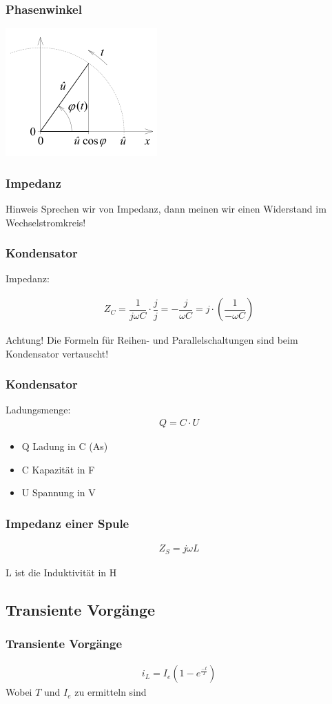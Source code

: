\documentclass[german,ignorenonframetext]{beamer} %
\begin{document}
\begin{frame}
\frametitle{Phasenwinkel}
\begin{center}
\includegraphics[scale=0.5]{../phase.png} 
\end{center}
\end{frame}

\begin{frame}
\frametitle{Impedanz}
\begin{block}{Hinweis}
Sprechen wir von Impedanz, dann meinen wir einen Widerstand im Wechselstromkreis!
\end{block}
\end{frame}

\begin{frame}
\frametitle{Kondensator}
Impedanz:
\begin{center}
\begin{eqnarray}
Z_{C} = \dfrac{1}{j \omega C} \cdot \dfrac{j}{j} = - \dfrac{j}{\omega C} = j \cdot (\dfrac{1}{- \omega C})
\end{eqnarray}
\end{center}
\begin{alertblock}{Achtung!}
Die Formeln für Reihen- und Parallelschaltungen sind beim Kondensator vertauscht!
\end{alertblock}
\end{frame}

\begin{frame}
\frametitle{Kondensator}
Ladungsmenge:
\begin{eqnarray}
Q = C \cdot U
\end{eqnarray}

\begin{itemize}
\item Q Ladung in C (As)
\item C Kapazität in F
\item U Spannung in V
\end{itemize}
\end{frame}

\begin{frame}
\frametitle{Impedanz einer Spule}
\begin{center}
\begin{eqnarray}
Z_{S} = j \omega L
\end{eqnarray}
\end{center}
L ist die Induktivität in H
\end{frame}


\subsection{Transiente Vorgänge}
\begin{frame}
\frametitle{Transiente Vorgänge}
\begin{center}
\begin{eqnarray}
    i_{L} = I_{e} ( 1 - e^{\frac{-t}{T}})
\end{eqnarray}
Wobei $T$ und $I_{e}$ zu ermitteln sind
\end{center}
\end{frame}
\end{document}
